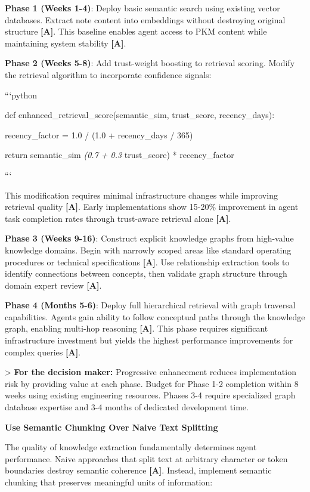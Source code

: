 \documentclass[a4paper,11pt]{article}
\newcommand{\alabel}{\textbf{\textcolor{acolor}{[A]}}}
\begin{document}
\textbf{Phase 1 (Weeks 1-4)}: Deploy basic semantic search using existing vector databases. Extract note content into embeddings without destroying original structure \alabel{}. This baseline enables agent access to PKM content while maintaining system stability \alabel{}.


\textbf{Phase 2 (Weeks 5-8)}: Add trust-weight boosting to retrieval scoring. Modify the retrieval algorithm to incorporate confidence signals:


```python

def enhanced\_retrieval\_score(semantic\_sim, trust\_score, recency\_days):

recency\_factor = 1.0 / (1.0 + recency\_days / 365)

return semantic\_sim \textit{ (0.7 + 0.3 } trust\_score) * recency\_factor

```


This modification requires minimal infrastructure changes while improving retrieval quality \alabel{}. Early implementations show 15-20\% improvement in agent task completion rates through trust-aware retrieval alone \alabel{}.


\textbf{Phase 3 (Weeks 9-16)}: Construct explicit knowledge graphs from high-value knowledge domains. Begin with narrowly scoped areas like standard operating procedures or technical specifications \alabel{}. Use relationship extraction tools to identify connections between concepts, then validate graph structure through domain expert review \alabel{}.


\textbf{Phase 4 (Months 5-6)}: Deploy full hierarchical retrieval with graph traversal capabilities. Agents gain ability to follow conceptual paths through the knowledge graph, enabling multi-hop reasoning \alabel{}. This phase requires significant infrastructure investment but yields the highest performance improvements for complex queries \alabel{}.


> \textbf{For the decision maker:} Progressive enhancement reduces implementation risk by providing value at each phase. Budget for Phase 1-2 completion within 8 weeks using existing engineering resources. Phases 3-4 require specialized graph database expertise and 3-4 months of dedicated development time.


\textbf{Use Semantic Chunking Over Naive Text Splitting}\par

The quality of knowledge extraction fundamentally determines agent performance. Naive approaches that split text at arbitrary character or token boundaries destroy semantic coherence \alabel{}. Instead, implement semantic chunking that preserves meaningful units of information:
\end{document}
